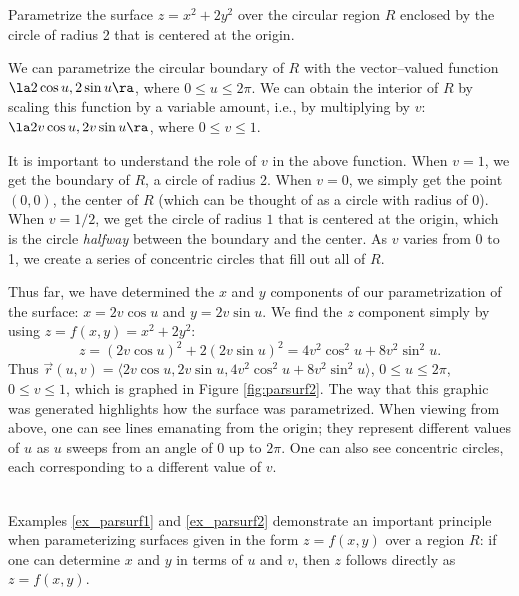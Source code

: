 {Parametrize the surface $z=x^2+2y^2$ over the circular region $R$ enclosed by the circle of radius 2 that is centered at the origin.
}
{We can parametrize the circular boundary of $R$ with the vector--valued function $\la 2\cos u,2\sin u\ra$, where $0\leq u\leq 2\pi$. We can obtain the interior of $R$ by scaling this function by a variable amount, i.e., by multiplying by $v$: $\la 2v\cos u,2v\sin u\ra$, where $0\leq v\leq 1$. 

It is important to understand the role of $v$ in the above function. When $v=1$, we get the boundary of $R$, a circle of radius 2. When $v=0$, we simply get the point $(0,0)$, the center of $R$ (which can be thought of as a circle with radius of 0). When $v=1/2$, we get the circle of radius $1$ that is centered at the origin, which is the circle \emph{halfway} between the boundary and the center. As $v$ varies from 0 to 1, we create a series of concentric circles that fill out all of $R$.


Thus far, we have determined the $x$ and $y$ components of our parametrization of the surface: $x=2v\cos u$ and $y=2v\sin u$. We find the $z$ component simply by using $z = f(x,y) = x^2+2y^2$: 
$$z = (2v\cos u)^2+2(2v\sin u)^2 = 4v^2\cos^2u+8v^2\sin^2u.$$
Thus $\vec r(u,v) = \langle 2v\cos u,2v\sin u,4v^2\cos^2u+8v^2\sin^2u\rangle$, $0\leq u\leq 2\pi$, $0\leq v\leq 1$, which is graphed in Figure \ref{fig:parsurf2}. The way that this graphic was generated highlights how the surface was parametrized. When viewing from above, one can see lines emanating from the origin; they represent different values of $u$ as $u$ sweeps from an angle of 0 up to $2\pi$. One can also see concentric circles, each corresponding to a different value of $v$. 
}\\

Examples \ref{ex_parsurf1} and \ref{ex_parsurf2} demonstrate an important principle when parameterizing surfaces given in the form $z=f(x,y)$ over a region $R$: if one can determine $x$ and $y$ in terms of $u$ and $v$, then $z$ follows directly as $z=f(x,y)$. 

